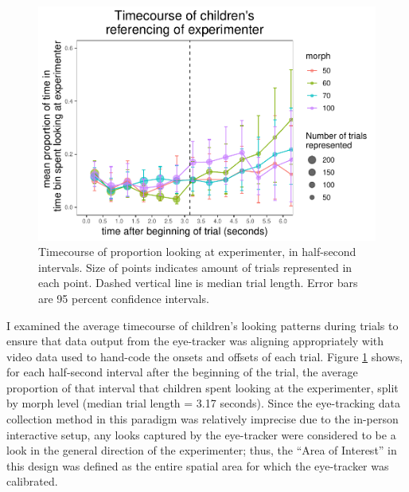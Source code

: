 \documentclass[,man,floatsintext]{apa6}
\begin{document}
\begin{figure}
\centering
\includegraphics{soc_ref_category_paper_files/figure-latex/forwardtimecourse-1.pdf}
\caption{\label{fig:forwardtimecourse}Timecourse of proportion looking at experimenter, in half-second intervals. Size of points indicates amount of trials represented in each point. Dashed vertical line is median trial length. Error bars are 95 percent confidence intervals.}
\end{figure}

I examined the average timecourse of children's looking patterns during trials to ensure that data output from the eye-tracker was aligning appropriately with video data used to hand-code the onsets and offsets of each trial. Figure \ref{fig:forwardtimecourse} shows, for each half-second interval after the beginning of the trial, the average proportion of that interval that children spent looking at the experimenter, split by morph level (median trial length = 3.17 seconds). Since the eye-tracking data collection method in this paradigm was relatively imprecise due to the in-person interactive setup, any looks captured by the eye-tracker were considered to be a look in the general direction of the experimenter; thus, the \enquote{Area of Interest} in this design was defined as the entire spatial area for which the eye-tracker was calibrated.
\end{document}
